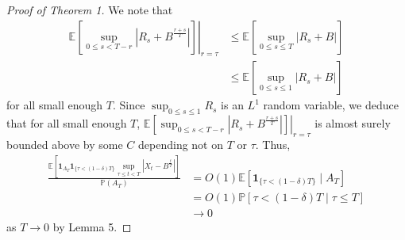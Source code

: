 \documentclass{article}
\theoremstyle{definition}
\theoremstyle{definition}
\begin{document}
\begin{proof}[Proof of Theorem 1]
We note that
$$
\begin{aligned}
\left.\mathbb{E}\left[\sup _{0 \leq s<T-r}\left|R_{s}+B^{\frac{r+s}{T}}\right|\right]\right|_{r=\tau} & \leq \mathbb{E}\left[\sup _{0 \leq s \leq T}\left|R_{s}+B\right|\right] \\
& \leq \mathbb{E}\left[\sup _{0 \leq s \leq 1}\left|R_{s}+B\right|\right]
\end{aligned}
$$
for all small enough $T$. Since $\sup _{0 \leq s \leq 1} R_{s}$ is an $L^{1}$ random variable, we deduce that for all small enough $T$, $\left.\mathbb{E}\left[\sup _{0 \leq s<T-r}\left|R_{s}+B^{\frac{r+s}{T}}\right|\right]\right|_{r=\tau}$ is almost surely bounded above by some $C$ depending not on $T$ or $\tau$. Thus,
$$
\begin{aligned}
\frac{\mathbb{E}\left[\mathbf{1}_{A_{T}} \mathbf{1}_{\{\tau<(1-\delta) T\}} \sup _{\tau \leq t<T}\left|X_{t}-B^{\frac{t}{T}}\right|\right]}{\mathbb{P}\left(A_{T}\right)} & =O(1) \mathbb{E}\left[\mathbf{1}_{\{\tau<(1-\delta) T\}} \mid A_{T}\right] \\
& =O(1) \mathbb{P}[\tau<(1-\delta) T \mid \tau \leq T] \\
& \rightarrow 0
\end{aligned}
$$
as $T \rightarrow 0$ by Lemma 5.


\end{proof}
\end{document}
